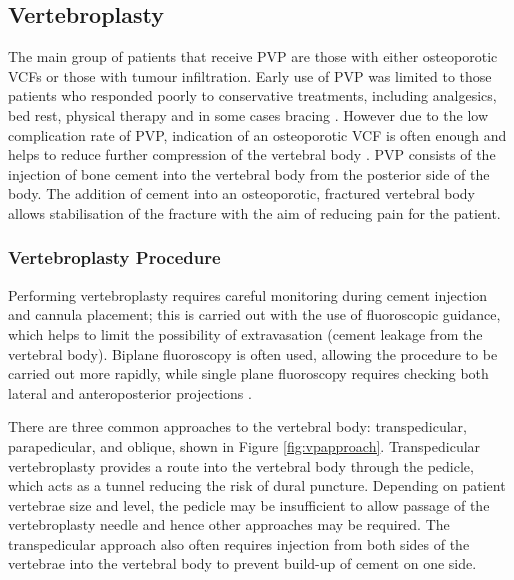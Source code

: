 \subsection{Vertebroplasty}\label{vertebroplasty}

The main group of patients that receive
PVP are those with either osteoporotic VCFs or those with tumour
infiltration. Early use of PVP was limited to those patients who
responded poorly to conservative treatments, including analgesics, bed
rest, physical therapy and in some cases bracing \cite{Mathis2001}. However due
to
the low complication rate of PVP, indication of an osteoporotic VCF is
often enough and helps to reduce further compression of the vertebral
body \cite{Diamond2006}. PVP consists of the injection of bone cement into the
vertebral body from the posterior side of the body. The addition of
cement into an osteoporotic, fractured vertebral body allows
stabilisation of the fracture with the aim of reducing pain for the
patient.

\subsubsection{Vertebroplasty Procedure}\label{vertebroplasty-procedure}

Performing vertebroplasty requires careful monitoring during cement
injection and cannula placement; this is carried out with the use of
fluoroscopic guidance, which helps to limit the possibility of
extravasation (cement leakage from the vertebral body). Biplane fluoroscopy is often used, allowing the procedure
to be carried out more rapidly, while single plane fluoroscopy requires
checking both lateral and anteroposterior projections \cite{Mathis2001}.

There are three common approaches to the vertebral body: transpedicular,
parapedicular, and oblique, shown in Figure \ref{fig:vpapproach}.
Transpedicular
vertebroplasty
provides
a
route into the vertebral body through the pedicle, which acts as a
tunnel reducing the risk of dural puncture. Depending on patient
vertebrae size and level, the pedicle may be insufficient to allow
passage of the vertebroplasty needle and hence other approaches may be
required. The transpedicular approach also often requires injection from
both sides of the vertebrae into the vertebral body to prevent build-up
of cement on one side.

